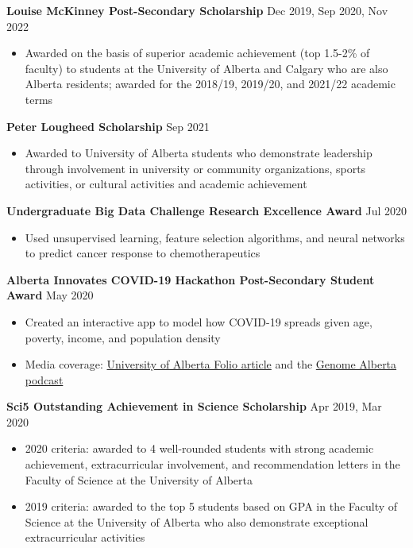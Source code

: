 \documentclass{article}
\begin{document}
\textbf{Louise McKinney Post-Secondary Scholarship} \hfill Dec 2019, Sep 2020, Nov 2022
\begin{itemize}
    \item Awarded on the basis of superior academic achievement (top 1.5-2\% of faculty) to students at the University of Alberta and Calgary who are also Alberta residents; awarded for the 2018/19, 2019/20, and 2021/22 academic terms
\end{itemize} \vspace{1em}

\textbf{Peter Lougheed Scholarship} \hfill Sep 2021
\begin{itemize}
    \item Awarded to University of Alberta students who demonstrate leadership through involvement in university or community organizations, sports activities, or cultural activities and academic achievement
\end{itemize} \vspace{1em}

\textbf{Undergraduate Big Data Challenge Research Excellence Award} \hfill Jul 2020
\begin{itemize}
    \item Used unsupervised learning, feature selection algorithms, and neural networks to predict cancer response to chemotherapeutics
\end{itemize} \vspace{1em}

\textbf{Alberta Innovates COVID-19 Hackathon Post-Secondary Student Award} \hfill May 2020
\begin{itemize}
    \item Created an interactive app to model how COVID-19 spreads given age, poverty, income, and population density
    \item Media coverage: \href{https://www.folio.ca/students-develop-online-tool-to-predict-covid-19-spread-based-on-demographics/}{University of Alberta Folio article} and the \href{https://genomealberta.ca/genomics/genomics_blog_08182001.aspx}{Genome Alberta podcast}
\end{itemize} \vspace{1em}

\textbf{Sci5 Outstanding Achievement in Science Scholarship} \hfill Apr 2019, Mar 2020
\begin{itemize}
    \item 2020 criteria: awarded to 4 well-rounded students with strong academic achievement, extracurricular involvement, and recommendation letters in the Faculty of Science at the University of Alberta
    \item 2019 criteria: awarded to the top 5 students based on GPA in the Faculty of Science at the University of Alberta who also demonstrate exceptional extracurricular activities
\end{itemize} \vspace{1em}
\end{document}
